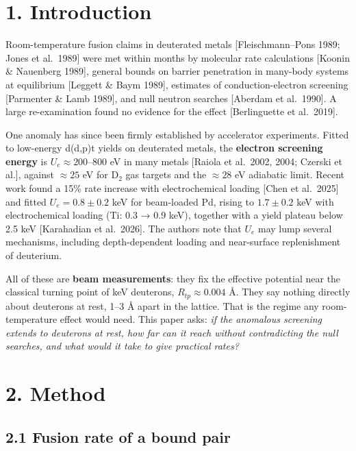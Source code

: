 \documentclass[
]{article}
\begin{document}
\hypertarget{introduction}{%
\section{1. Introduction}\label{introduction}}

Room-temperature fusion claims in deuterated metals {[}Fleischmann--Pons
1989; Jones et al.~1989{]} were met within months by molecular rate
calculations {[}Koonin \& Nauenberg 1989{]}, general bounds on barrier
penetration in many-body systems at equilibrium {[}Leggett \& Baym
1989{]}, estimates of conduction-electron screening {[}Parmenter \& Lamb
1989{]}, and null neutron searches {[}Aberdam et al.~1990{]}. A large
re-examination found no evidence for the effect {[}Berlinguette et
al.~2019{]}.

One anomaly has since been firmly established by accelerator
experiments. Fitted to low-energy d(d,p)t yields on deuterated metals,
the \textbf{electron screening energy} is \(U_e \approx 200\)--800 eV in
many metals {[}Raiola et al.~2002, 2004; Czerski et al.{]}, against
\(\approx 25\) eV for D\(_2\) gas targets and the \(\approx 28\) eV
adiabatic limit. Recent work found a 15\% rate increase with
electrochemical loading {[}Chen et al.~2025{]} and fitted
\(U_e = 0.8 \pm 0.2\) keV for beam-loaded Pd, rising to \(1.7 \pm 0.2\)
keV with electrochemical loading (Ti: 0.3 → 0.9 keV), together with a
yield plateau below 2.5 keV {[}Karahadian et al.~2026{]}. The authors
note that \(U_e\) may lump several mechanisms, including depth-dependent
loading and near-surface replenishment of deuterium.

All of these are \textbf{beam measurements}: they fix the effective
potential near the classical turning point of keV deuterons,
\(R_{tp}\approx 0.004\) Å. They say nothing directly about deuterons at
rest, 1--3 Å apart in the lattice. That is the regime any
room-temperature effect would need. This paper asks: \emph{if the
anomalous screening extends to deuterons at rest, how far can it reach
without contradicting the null searches, and what would it take to give
practical rates?}

\hypertarget{method}{%
\section{2. Method}\label{method}}

\hypertarget{fusion-rate-of-a-bound-pair}{%
\subsection{2.1 Fusion rate of a bound
pair}\label{fusion-rate-of-a-bound-pair}}
\end{document}
